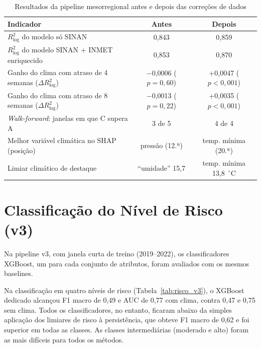 \begin{apendicesenv}
\begin{table}[htb]
\centering
\caption{Resultados da pipeline mesorregional antes e depois das correções de dados}
\label{tab:antes_depois}
\small
\begin{tabular}{|p{}|c|c|}
\hline
\textbf{Indicador} & \textbf{Antes} & \textbf{Depois} \\ \hline
$R^2_{\log}$ do modelo só SINAN & 0,843 & 0,859 \\ \hline
$R^2_{\log}$ do modelo SINAN + INMET enriquecido & 0,853 & 0,870 \\ \hline
Ganho do clima com atraso de 4 semanas ($\Delta R^2_{\log}$) & $-$0,0006 ($p=0{,}60$) & +0,0047 ($p<0{,}001$) \\ \hline
Ganho do clima com atraso de 8 semanas ($\Delta R^2_{\log}$) & $-$0,0013 ($p=0{,}22$) & +0,0035 ($p<0{,}001$) \\ \hline
\textit{Walk-forward}: janelas em que C supera A & 3 de 5 & 4 de 4 \\ \hline
Melhor variável climática no SHAP (posição) & pressão (12.ª) & temp. mínima (20.ª) \\ \hline
Limiar climático de destaque & ``umidade'' 15,7 & temp. mínima 13,8~$^\circ$C \\ \hline
\end{tabular}
\end{table}

\section{Classificação do Nível de Risco (v3)}

Na pipeline v3, com janela curta de treino (2019--2022), os classificadores XGBoost, um para cada conjunto de atributos, foram avaliados com os mesmos baselines.

Na classificação em quatro níveis de risco (Tabela~\ref{tab:risco_v3}), o XGBoost dedicado alcançou F1 macro de 0,49 e AUC de 0,77 com clima, contra 0,47 e 0,75 sem clima. Todos os classificadores, no entanto, ficaram abaixo da simples aplicação dos limiares de risco à persistência, que obteve F1 macro de 0,62 e foi superior em todas as classes. As classes intermediárias (moderado e alto) foram as mais difíceis para todos os métodos.


\end{apendicesenv}
